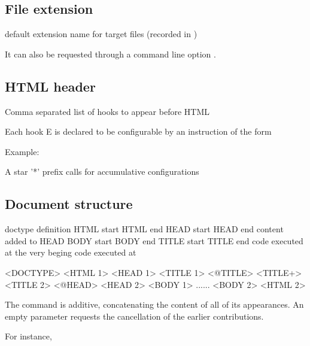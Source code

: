 \subsection{File extension}

 {default extension name for target files  (recorded in )} \EndDoc

It can also be requested through a command line option .

\subsection{HTML header}
 {Comma separated list of hooks to appear before HTML} \EndDoc

Each hook E is declared to be configurable by an instruction of the form 


Example:

\begin{texsource}
\end{texsource}

A star '*' prefix calls for accumulative configurations

\subsection{Document structure}


 {doctype definition}\EndDoc
{} {HTML start} {HTML end}\EndDoc
{} {HEAD start} {HEAD end}\EndDoc
{} {content added to HEAD}\EndDoc
{} {BODY start} {BODY end}\EndDoc
{} {TITLE start} {TITLE end}\EndDoc
{} {code executed at the very beging} {code executed at }\EndDoc

\begin{texsource}
<DOCTYPE>
<HTML 1>
  <HEAD 1>
     <TITLE 1>
        <@TITLE>
        <TITLE+>
     <TITLE 2>
     <@HEAD>
  <HEAD 2>
  <BODY 1>
  ......
  <BODY 2>
<HTML 2>
\end{texsource}

The  command is additive, concatenating the
content of all of its appearances.  An empty parameter requests
the cancellation of the earlier contributions.

For instance,

